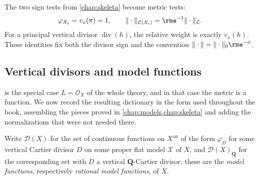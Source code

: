The two sign tests from \cref{chap:skeleta} become metric tests:
\[
 \varphi_{\mathcal X_s}=v_x(\pi)=1,\qquad
 \|\cdot\|_{\mathcal L(\mathcal X_s)}
      =\rme^{-1}\|\cdot\|_{\mathcal L}.
\]
For a principal vertical divisor $\operatorname{div}(h)$, the relative
weight is exactly $v_x(h)$. These identities fix both the divisor sign and
the convention $\|\cdot\|=\|\cdot\|_0\rme^{-\phi}$.

\subsection{Vertical divisors and model functions}
\label{sec:metrics-divisor-dictionary}

 is the special case $L=\mathcal O_X$
of the whole theory, and in that case the metric is a function. We now
record the resulting dictionary in the form used throughout the book,
assembling the pieces proved in \cref{chap:models,chap:skeleta} and adding
the normalizations that were not needed there.

Write $\mathcal D(X)$ for the set of continuous functions on
$X^{\mathrm{an}}$ of the form $\varphi_D$ for some vertical Cartier
divisor $D$ on some proper flat model $\mathcal X$ of $X$, and
$\mathcal D(X)_{\mathbf Q}$ for the corresponding set with $D$ a
vertical $\mathbf Q$-Cartier divisor; these are the \emph{model
functions}, respectively \emph{rational model functions}, of $X$.

